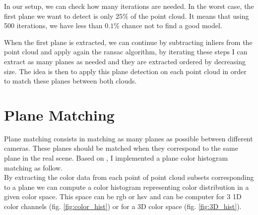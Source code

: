 In our setup, we can check how many iterations are needed. In the worst case, the first plane we want to detect is only $25\%$ of the point cloud. It means that using 500 iterations, we have less than $0.1\%$ chance not to find a good model. 

When the first plane is extracted, we can continue by subtracting inliers from the point cloud and apply again the \acrshort{ransac} algorithm, by iterating these steps I can extract as many planes as needed and they are extracted ordered by decreasing size. The idea is then to apply this plane detection on each point cloud in order to match these planes between both clouds. 

\section{Plane Matching} \label{sec:plane_matching}

Plane matching consists in matching as many planes as possible between different cameras. These planes should be matched when they correspond to the same plane in the real scene. Based on \cite{mdou2013}, I implemented a plane color histogram matching as follow. \\
By extracting the color data from each point of point cloud subsets corresponding to a plane we can compute a color histogram representing color distribution in a given color space. This space can be \acrshort{rgb} or \acrshort{hsv} and can be computer for 3 1D color channels (fig. \ref{fig:color_hist}) or for a 3D color space (fig. \ref{fig:3D_hist}).


